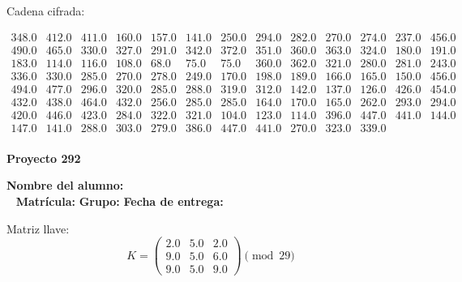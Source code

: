 \documentclass[12pt]{article}
\begin{document}
Cadena cifrada:
\begin{center}
$\begin{array}{lllllllllllll}
348.0 & 412.0 & 411.0 & 160.0 & 157.0 & 141.0 & 250.0 & 294.0 & 282.0 & 270.0 & 274.0 & 237.0 & 456.0\\
490.0 & 465.0 & 330.0 & 327.0 & 291.0 & 342.0 & 372.0 & 351.0 & 360.0 & 363.0 & 324.0 & 180.0 & 191.0\\
183.0 & 114.0 & 116.0 & 108.0 & 68.0 & 75.0 & 75.0 & 360.0 & 362.0 & 321.0 & 280.0 & 281.0 & 243.0\\
336.0 & 330.0 & 285.0 & 270.0 & 278.0 & 249.0 & 170.0 & 198.0 & 189.0 & 166.0 & 165.0 & 150.0 & 456.0\\
494.0 & 477.0 & 296.0 & 320.0 & 285.0 & 288.0 & 319.0 & 312.0 & 142.0 & 137.0 & 126.0 & 426.0 & 454.0\\
432.0 & 438.0 & 464.0 & 432.0 & 256.0 & 285.0 & 285.0 & 164.0 & 170.0 & 165.0 & 262.0 & 293.0 & 294.0\\
420.0 & 446.0 & 423.0 & 284.0 & 322.0 & 321.0 & 104.0 & 123.0 & 114.0 & 396.0 & 447.0 & 441.0 & 144.0\\
147.0 & 141.0 & 288.0 & 303.0 & 279.0 & 386.0 & 447.0 & 441.0 & 270.0 & 323.0 & 339.0\\
\end{array}$
\end{center}

\newpage


\textbf{Proyecto 292}

\textbf{Nombre del alumno:} \underline{\hspace{13cm}}\\\
\vspace{1cm}
\textbf{Matrícula:} \underline{\hspace{4cm}} \hspace{1cm}
\textbf{Grupo:} \underline{\hspace{2cm}}
\textbf{Fecha de entrega:} \underline{\hspace{2cm}}

\medskip

Matriz llave:
\[
K = \begin{pmatrix}
2.0 & 5.0 & 2.0\\
9.0 & 5.0 & 6.0\\
9.0 & 5.0 & 9.0
\end{pmatrix} \pmod{29}
\]
\end{document}
